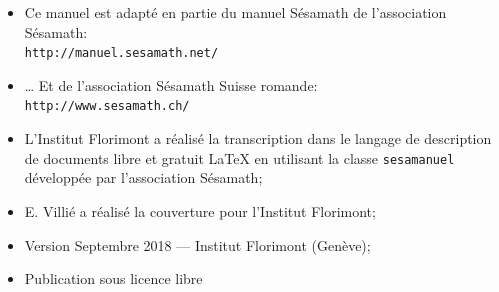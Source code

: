 \documentclass[TS]{sesamanuel}
\begin{document}


\vfill



\newpage

\begin{prerequis}
\begin{itemize}
\item  Ce manuel est adapté en partie du manuel Sésamath de l'association Sésamath:\\
\texttt{http://manuel.sesamath.net/}
\item … Et de l'association Sésamath Suisse romande:\\ \texttt{http://www.sesamath.ch/}
\item L'Institut Florimont a réalisé la transcription dans le langage de description de documents libre et gratuit \LaTeX{} en utilisant la classe \texttt{sesamanuel} développée par l'association Sésamath;
\item E. Villié a réalisé la couverture pour l'Institut Florimont;
\item Version Septembre 2018 --- Institut Florimont (Genève);\vspace{.3em}
\item Publication sous licence libre \hspace{1em} 
\end{itemize}
 \end{prerequis}

\vspace{1em}

\setcounter{chapter}{0}


\setcounter{page}{4}
\setcounter{chapter}{8} %

%

%
\end{document}
